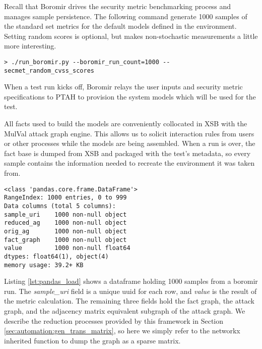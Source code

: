 



Recall that Boromir drives the security metric benchmarking process and manages sample persistence. The following command generate 1000 samples of the standard set metrics for the default models defined in the environment. Setting random scores is optional, but makes non-stochastic measurements a little more interesting.

 \begin{verbatim}> ./run_boromir.py --boromir_run_count=1000 --secmet_random_cvss_scores\end{verbatim} 

When a test run kicks off, Boromir relays the user inputs and security metric specifications to PTAH to provision the system models which will be used for the test.

All facts used to build the models are conveniently collocated in XSB with the MulVal\cite{Ou_Appel_2005} attack graph engine. This allows us to solicit interaction rules from users or other processes while the models are being assembled. When a run is over, the fact base is dumped from XSB and packaged with the test's metadata, so every sample contains the information needed to recreate the environment it was taken from. 


\begin{verbatim}
<class 'pandas.core.frame.DataFrame'>
RangeIndex: 1000 entries, 0 to 999
Data columns (total 5 columns):
sample_uri    1000 non-null object
reduced_ag    1000 non-null object
orig_ag       1000 non-null object
fact_graph    1000 non-null object
value         1000 non-null float64
dtypes: float64(1), object(4)
memory usage: 39.2+ KB
\end{verbatim}
\label{lst:pandas_load}

Listing \ref{lst:pandas_load} shows a dataframe holding 1000 samples from a boromir run. The \textit{sample\_uri} field is a unique uuid for each row, and \textit{value} is the result of the metric calculation. The remaining three fields hold the fact graph, the attack graph, and the adjacency matrix equivalent subgraph  of the attack graph. We describe the reduction processes provided by this framework in Section \ref{sec:automation:gen_trans_matrix}, so here we simply refer to the networkx inherited function to dump the graph as a sparse matrix. 



